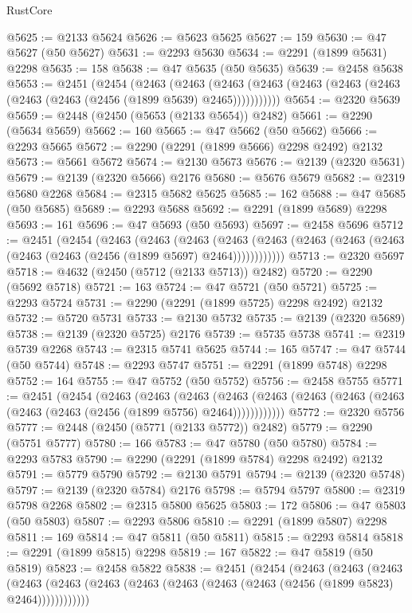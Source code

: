 \begin{lexlean}{RustCore}
\begin{coremodule}
@5625 := @2133 @5624
@5626 := @5623 @5625
@5627 := 159
@5630 := @47 @5627 (@50 @5627)
@5631 := @2293 @5630
@5634 := @2291 (@1899 @5631) @2298
@5635 := 158
@5638 := @47 @5635 (@50 @5635)
@5639 := @2458 @5638
@5653 := @2451
    (@2454
      (@2463
        (@2463
          (@2463 (@2463 (@2463 (@2463 (@2463 (@2463 (@2463 (@2456 (@1899 @5639) @2465)))))))))))
@5654 := @2320 @5639
@5659 := @2448 (@2450 (@5653 (@2133 @5654)) @2482)
@5661 := @2290 (@5634 @5659)
@5662 := 160
@5665 := @47 @5662 (@50 @5662)
@5666 := @2293 @5665
@5672 := @2290 (@2291 (@1899 @5666) @2298 @2492) @2132
@5673 := @5661 @5672
@5674 := @2130 @5673
@5676 := @2139 (@2320 @5631)
@5679 := @2139 (@2320 @5666) @2176
@5680 := @5676 @5679
@5682 := @2319 @5680 @2268
@5684 := @2315 @5682 @5625
@5685 := 162
@5688 := @47 @5685 (@50 @5685)
@5689 := @2293 @5688
@5692 := @2291 (@1899 @5689) @2298
@5693 := 161
@5696 := @47 @5693 (@50 @5693)
@5697 := @2458 @5696
@5712 := @2451
    (@2454
      (@2463
        (@2463
          (@2463
            (@2463 (@2463 (@2463 (@2463 (@2463 (@2463 (@2463 (@2456 (@1899 @5697) @2464))))))))))))
@5713 := @2320 @5697
@5718 := @4632 (@2450 (@5712 (@2133 @5713)) @2482)
@5720 := @2290 (@5692 @5718)
@5721 := 163
@5724 := @47 @5721 (@50 @5721)
@5725 := @2293 @5724
@5731 := @2290 (@2291 (@1899 @5725) @2298 @2492) @2132
@5732 := @5720 @5731
@5733 := @2130 @5732
@5735 := @2139 (@2320 @5689)
@5738 := @2139 (@2320 @5725) @2176
@5739 := @5735 @5738
@5741 := @2319 @5739 @2268
@5743 := @2315 @5741 @5625
@5744 := 165
@5747 := @47 @5744 (@50 @5744)
@5748 := @2293 @5747
@5751 := @2291 (@1899 @5748) @2298
@5752 := 164
@5755 := @47 @5752 (@50 @5752)
@5756 := @2458 @5755
@5771 := @2451
    (@2454
      (@2463
        (@2463
          (@2463
            (@2463 (@2463 (@2463 (@2463 (@2463 (@2463 (@2463 (@2456 (@1899 @5756) @2464))))))))))))
@5772 := @2320 @5756
@5777 := @2448 (@2450 (@5771 (@2133 @5772)) @2482)
@5779 := @2290 (@5751 @5777)
@5780 := 166
@5783 := @47 @5780 (@50 @5780)
@5784 := @2293 @5783
@5790 := @2290 (@2291 (@1899 @5784) @2298 @2492) @2132
@5791 := @5779 @5790
@5792 := @2130 @5791
@5794 := @2139 (@2320 @5748)
@5797 := @2139 (@2320 @5784) @2176
@5798 := @5794 @5797
@5800 := @2319 @5798 @2268
@5802 := @2315 @5800 @5625
@5803 := 172
@5806 := @47 @5803 (@50 @5803)
@5807 := @2293 @5806
@5810 := @2291 (@1899 @5807) @2298
@5811 := 169
@5814 := @47 @5811 (@50 @5811)
@5815 := @2293 @5814
@5818 := @2291 (@1899 @5815) @2298
@5819 := 167
@5822 := @47 @5819 (@50 @5819)
@5823 := @2458 @5822
@5838 := @2451
    (@2454
      (@2463
        (@2463
          (@2463
            (@2463 (@2463 (@2463 (@2463 (@2463 (@2463 (@2463 (@2456 (@1899 @5823) @2464))))))))))))

\end{coremodule}
\end{lexlean}
